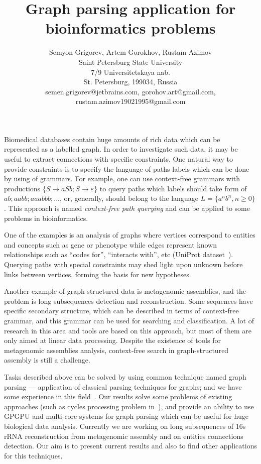 \documentclass[12pt]{article}  %
\title{Graph parsing application for bioinformatics problems}
\author{Semyon Grigorev, Artem Gorokhov, Rustam Azimov
\\
       {Saint Petersburg State University}\\
       {7/9 Universitetskaya nab.}\\
       {St. Petersburg, 199034, Russia}\\
       semen.grigorev@jetbrains.com, gorohov.art@gmail.com,\\ rustam.azimov19021995@gmail.com
       }
\date{}
\theoremstyle{definition}
\theoremstyle{remark}
\begin{document}
\maketitle

Biomedical databases contain huge amounts of rich data which can be represented as a labelled graph.
In order to investigate such data, it may be useful to extract connections with specific constraints.
One natural way to provide constraints is to specify the language of paths labels which can be done by using of grammars.
For example, one can use context-free grammars with productions $\{S \rightarrow a S b; S \rightarrow \varepsilon \}$ to query paths which labels should take form of $ab; aabb; aaabbb; ...$, or, generally, should belong to the language $L = \{a^n b^n, n \geq 0\}$.
This approach is named \emph{context-free path querying} and can be applied to some problems in bioinformatics.

One of the examples is an analysis of graphs where vertices correspond to entities and concepts such as gene or phenotype while edges represent known relationships such as ``codes for'', ``interacts with'', etc (UniProt dataset~\cite{UniProt}).
Querying paths with special constraints may shed light upon unknown before links between vertices, forming the basis for new hypotheses.

Another example of graph structured data is metagenomic assemblies, and the problem is long subsequences detection and reconstruction.
Some sequences have specific secondary structure, which can be described in terms of context-free grammar, and this grammar can be used for searching and classification.
A lot of research in this area and tools are based on this approach, but most of them are only aimed at linear data processing.
Despite the existence of tools for metagenomic assemblies analysis, context-free search in graph-structured assembly is still a challenge.

Tasks described above can be solved by using common technique named graph parsing --- application of classical parsing techniques for graphs; and we have some experience in this field~\cite{GraphGLL, RelaxedRNGLR}.
Our results solve some problems of existing approaches (such as cycles processing problem in~\cite{Earley}), and provide an ability to use GPGPU and multi-core systems for graph parsing which can be useful for huge biological data analysis.
Currently we are working on long subsequences of 16s rRNA reconstruction from metagenomic assembly and on entities connections detection.
Our aim is to present current results and also to find other applications for this techniques.
\end{document}
